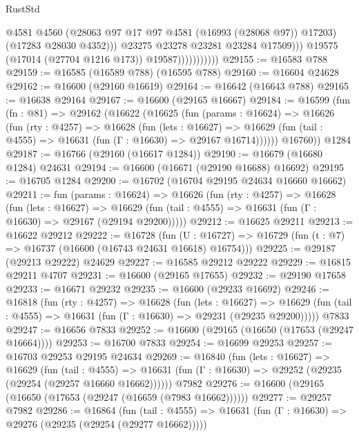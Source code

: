 \begin{lexlean}{RustStd}
\begin{coremodule}
                                    @4581
                                    @4560
                                    (@28063 @97 @17 @97 @4581 (@16993 (@28068 @97)) @17203)
                                    (@17283 @28030 @4352)))
                                @23275
                                @23278
                                @23281
                                @23284
                                @17509)))
                          @19575
                          (@17014 (@27704 @1216 @173))
                          @19587)))))))))))
@29155 := @16583 @788
@29159 := @16585 (@16589 @788) (@16595 @788)
@29160 := @16604 @24628
@29162 := @16600 (@29160 @16619)
@29164 := @16642 (@16643 @788)
@29165 := @16638 @29164
@29167 := @16600 (@29165 @16667)
@29184 := @16599
    (fun (fn : @81) =>
    @29162
      (@16622
        (@16625
          (fun (params : @16624) =>
          @16626
            (fun (rty : @4257) =>
            @16628
              (fun (lets : @16627) =>
              @16629 (fun (tail : @4555) => @16631 (fun (Γ : @16630) => @29167 @16714))))))
        @16760))
    @1284
@29187 := @16766 (@29160 (@16617 @1284))
@29190 := @16679 (@16680 @1284) @24631
@29194 := @16600 (@16671 (@29190 @16688) @16692)
@29195 := @16705 @1284
@29200 := @16702 (@16704 @29195 @24634 @16660 @16662)
@29211 := fun (params : @16624) =>
  @16626
    (fun (rty : @4257) =>
    @16628
      (fun (lets : @16627) =>
      @16629 (fun (tail : @4555) => @16631 (fun (Γ : @16630) => @29167 (@29194 @29200)))))
@29212 := @16625 @29211
@29213 := @16622 @29212
@29222 := @16728
    (fun (U : @16727) => @16729 (fun (t : @7) => @16737 (@16600 (@16743 @24631 @16618) @16754)))
@29225 := @29187 (@29213 @29222) @24629
@29227 := @16585 @29212 @29222
@29229 := @16815 @29211 @4707
@29231 := @16600 (@29165 @17655)
@29232 := @29190 @17658
@29233 := @16671 @29232
@29235 := @16600 (@29233 @16692)
@29246 := @16818
    (fun (rty : @4257) =>
    @16628
      (fun (lets : @16627) =>
      @16629 (fun (tail : @4555) => @16631 (fun (Γ : @16630) => @29231 (@29235 @29200)))))
    @7833
@29247 := @16656 @7833
@29252 := @16600 (@29165 (@16650 (@17653 (@29247 @16664))))
@29253 := @16700 @7833
@29254 := @16699 @29253
@29257 := @16703 @29253 @29195 @24634
@29269 := @16840
    (fun (lets : @16627) =>
    @16629
      (fun (tail : @4555) =>
      @16631 (fun (Γ : @16630) => @29252 (@29235 (@29254 (@29257 @16660 @16662))))))
    @7982
@29276 := @16600 (@29165 (@16650 (@17653 (@29247 (@16659 (@7983 @16662))))))
@29277 := @29257 @7982
@29286 := @16864
    (fun (tail : @4555) => @16631 (fun (Γ : @16630) => @29276 (@29235 (@29254 (@29277 @16662)))))

\end{coremodule}
\end{lexlean}
